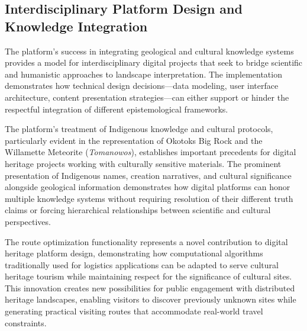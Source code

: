 \subsection{Interdisciplinary Platform Design and Knowledge Integration}
\label{subsec:interdisciplinary_design}

The platform's success in integrating geological and cultural knowledge systems provides a model for interdisciplinary digital projects that seek to bridge scientific and humanistic approaches to landscape interpretation. The implementation demonstrates how technical design decisions—data modeling, user interface architecture, content presentation strategies—can either support or hinder the respectful integration of different epistemological frameworks.

The platform's treatment of Indigenous knowledge and cultural protocols, particularly evident in the representation of Okotoks Big Rock and the Willamette Meteorite (\emph{Tomanowos}), establishes important precedents for digital heritage projects working with culturally sensitive materials. The prominent presentation of Indigenous names, creation narratives, and cultural significance alongside geological information demonstrates how digital platforms can honor multiple knowledge systems without requiring resolution of their different truth claims or forcing hierarchical relationships between scientific and cultural perspectives.


The route optimization functionality represents a novel contribution to digital heritage platform design, demonstrating how computational algorithms traditionally used for logistics applications can be adapted to serve cultural heritage tourism while maintaining respect for the significance of cultural sites. This innovation creates new possibilities for public engagement with distributed heritage landscapes, enabling visitors to discover previously unknown sites while generating practical visiting routes that accommodate real-world travel constraints.

